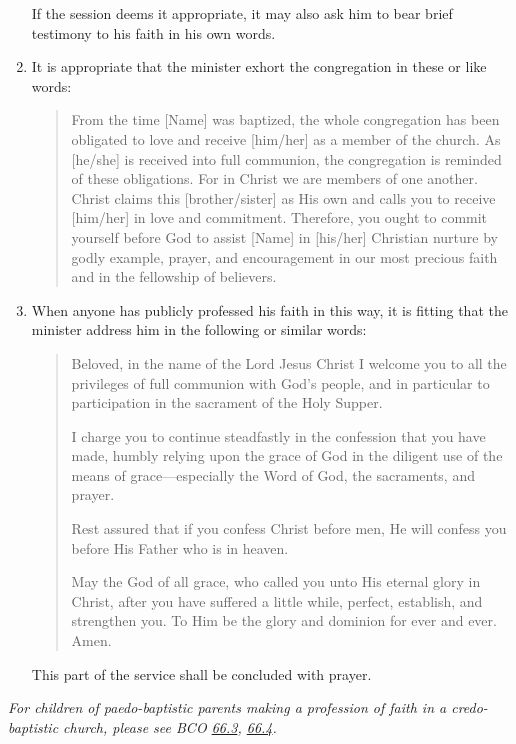 \documentclass[
]{book}
\begin{document}
\begin{enumerate}
  If the session deems it appropriate, it may also ask him to bear brief testimony to his faith in his own words.
\item
  It is appropriate that the minister exhort the congregation in these or like words:

  \begin{quote}
  From the time {[}Name{]} was baptized, the whole congregation has been obligated to love and receive {[}him/her{]} as a member of the church. As {[}he/she{]} is received into full communion, the congregation is reminded of these obligations. For in Christ we are members of one another. Christ claims this {[}brother/sister{]} as His own and calls you to receive {[}him/her{]} in love and commitment. Therefore, you ought to commit yourself before God to assist {[}Name{]} in {[}his/her{]} Christian nurture by godly example, prayer, and encouragement in our most precious faith and in the fellowship of believers.
  \end{quote}
\item
  When anyone has publicly professed his faith in this way, it is fitting that the minister address him in the following or similar words:

  \begin{quote}
  Beloved, in the name of the Lord Jesus Christ I welcome you to all the privileges of full communion with God's people, and in particular to participation in the sacrament of the Holy Supper.

  I charge you to continue steadfastly in the confession that you have made, humbly relying upon the grace of God in the diligent use of the means of grace---especially the Word of God, the sacraments, and prayer.

  Rest assured that if you confess Christ before men, He will confess you before His Father who is in heaven.

  May the God of all grace, who called you unto His eternal glory in Christ, after you have suffered a little while, perfect, establish, and strengthen you. To Him be the glory and dominion for ever and ever. Amen.
  \end{quote}

  This part of the service shall be concluded with prayer.
\end{enumerate}

\emph{For children of paedo-baptistic parents making a profession of faith in a credo-baptistic church, please see BCO \protect\hyperlink{66.3}{66.3}, \protect\hyperlink{66.4}{66.4}.}
\end{document}
